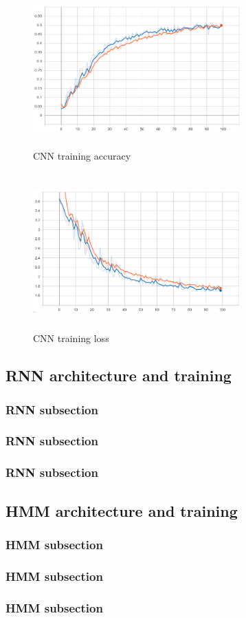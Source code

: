 \begin{figure}[h]
			\centering
	    	\includegraphics[width=8cm, height=6cm]{debug_tuy_acc}
	    	\caption{CNN training accuracy}
	    	\label{fig:CNN_accuracy}
\end{figure} 

\begin{figure}[h]
			\centering
	    	\includegraphics[width=8cm, height=6cm]{debug_tuy_loss}
	    	\caption{CNN training loss}
	    	\label{fig:CNN_loss}
\end{figure} 


\subsection* {\textbf {RNN architecture and training}}
\subsubsection{ \textbf {RNN subsection}} 
\subsubsection{ \textbf {RNN subsection}} 
\subsubsection{ \textbf {RNN subsection}} 

\subsection* {\textbf {HMM architecture and training}}
\subsubsection{ \textbf {HMM subsection}} 
\subsubsection{ \textbf {HMM subsection}} 
\subsubsection{ \textbf {HMM subsection}} 


